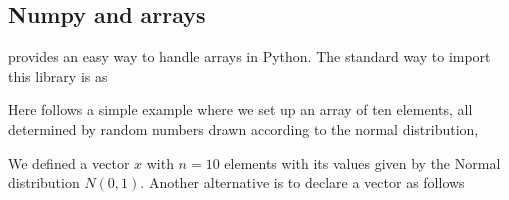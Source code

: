 \documentclass[letterpaper,10pt,english]{sphinxmanual}
\begin{document}
\subsection{Numpy and arrays}
\label{\detokenize{chapter3:numpy-and-arrays}}
 provides an easy way to handle arrays in Python. The standard way to import this library is as

\begin{sphinxVerbatim}[commandchars=\\\{\}]
   
\end{sphinxVerbatim}

Here follows a simple example where we set up an array of ten elements, all determined by random numbers drawn according to the normal distribution,

\begin{sphinxVerbatim}[commandchars=\\\{\}]
  
  
\end{sphinxVerbatim}

\begin{sphinxVerbatim}
\end{sphinxVerbatim}

We defined a vector \(x\) with \(n=10\) elements with its values given by the Normal distribution \(N(0,1)\).
Another alternative is to declare a vector as follows

\begin{sphinxVerbatim}[commandchars=\\\{\}]
   
  \PYG{p}{[}  \PYG{p}{]}
\end{sphinxVerbatim}

\begin{sphinxVerbatim}[commandchars=\\\{\}]
[1 2 3]
\end{sphinxVerbatim}
\end{document}
